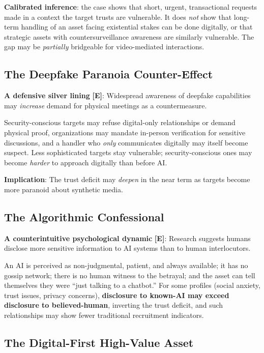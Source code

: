 \documentclass[11pt,letterpaper]{article}
\begin{document}
\textbf{Calibrated inference}: the case shows that short, urgent, transactional requests made in a context the target trusts are vulnerable. It does \textit{not} show that long-term handling of an asset facing existential stakes can be done digitally, or that strategic assets with countersurveillance awareness are similarly vulnerable. The gap may be \textit{partially} bridgeable for video-mediated interactions.

\subsection{The Deepfake Paranoia Counter-Effect}

\textbf{A defensive silver lining} \textbf{[E]}: Widespread awareness of deepfake capabilities may \textit{increase} demand for physical meetings as a countermeasure.

Security-conscious targets may refuse digital-only relationships or demand physical proof, organizations may mandate in-person verification for sensitive discussions, and a handler who \textit{only} communicates digitally may itself become suspect. Less sophisticated targets stay vulnerable; security-conscious ones may become \textit{harder} to approach digitally than before AI.

\textbf{Implication}: The trust deficit may \textit{deepen} in the near term as targets become more paranoid about synthetic media.

\subsection{The Algorithmic Confessional}

\textbf{A counterintuitive psychological dynamic} \textbf{[E]}: Research suggests humans disclose more sensitive information to AI systems than to human interlocutors.

An AI is perceived as non-judgmental, patient, and always available; it has no gossip network; there is no human witness to the betrayal; and the asset can tell themselves they were ``just talking to a chatbot.'' For some profiles (social anxiety, trust issues, privacy concerns), \textbf{disclosure to known-AI may exceed disclosure to believed-human}, inverting the trust deficit, and such relationships may show fewer traditional recruitment indicators.

\subsection{The Digital-First High-Value Asset}
\end{document}
